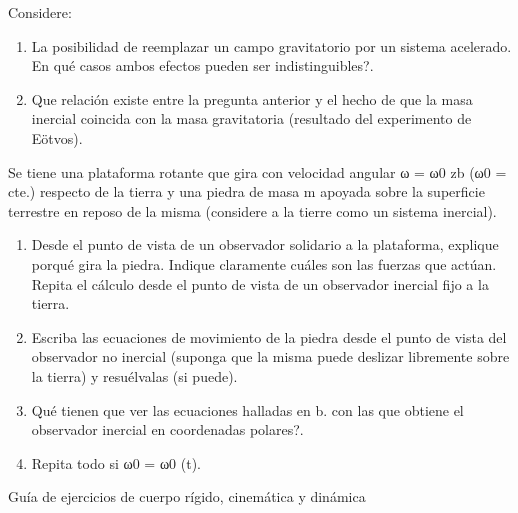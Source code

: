 \documentclass[10pt,oneside]{CBFT_book}
\begin{document}
\begin{ejercicios}
\label{ej9}
\item{ \bf }
Considere:
\begin{enumerate}[label=(\alph*)]
\item La posibilidad de reemplazar un campo gravitatorio por un sistema acelerado.
En qué casos ambos efectos pueden ser indistinguibles?.
\item Que relación existe entre la pregunta anterior y el hecho de que la masa inercial
coincida con la masa gravitatoria (resultado del experimento de Eötvos).
\end{enumerate}

\label{ej10}
\item{ \bf }
Se tiene una plataforma rotante que gira con velocidad angular ω = ω0 zb (ω0 = cte.)
respecto de la tierra y una piedra de masa m apoyada sobre la superficie terrestre en
reposo de la misma (considere a la tierre como un sistema inercial).
\begin{enumerate}[label=(\alph*)]
\item Desde el punto de vista de un observador solidario a la plataforma, explique
porqué gira la piedra. Indique claramente cuáles son las fuerzas que actúan.
Repita el cálculo desde el punto de vista de un observador inercial fijo a la tierra.
\item Escriba las ecuaciones de movimiento de la piedra desde el punto de vista del
observador no inercial (suponga que la misma puede deslizar libremente sobre la
tierra) y resuélvalas (si puede).
\item Qué tienen que ver las ecuaciones halladas en b. con las que obtiene el observador
inercial en coordenadas polares?.
\item Repita todo si ω0 = ω0 (t).
\end{enumerate}

\end{ejercicios}

Guía de ejercicios de cuerpo rígido, cinemática y dinámica
\end{document}
